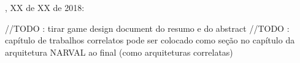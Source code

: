\documentclass[12pt, 
openright, 
oneside, 
a4paper,    
brazil]{facom-ufu-abntex2}
\begin{document}

\pagestyle{plain}



\imprimircapa

\begin{folhadeaprovacao}

  \begin{center}
    {\ABNTEXchapterfont\large\imprimirautor}

    \vspace*{\fill}\vspace*{\fill}
    {\ABNTEXchapterfont\bfseries\Large\imprimirtitulo}
    \vspace*{\fill}
    
    \hspace{.45\textwidth}
    \begin{minipage}{.5\textwidth}
    \imprimirpreambulo
    \end{minipage}%
    \vspace*{\fill}
   \end{center}
    
   \imprimirlocal, XX de XX de 2018: %

      
   \begin{center}
    \vspace*{0.5cm}
    {\large\imprimirlocal}
    \par
    {\large\imprimirdata}
    \vspace*{1cm}
  \end{center}
  
\end{folhadeaprovacao}

//TODO : tirar game design document do resumo e do 
abstract
//TODO : capítulo de trabalhos correlatos pode ser colocado como seção no capítulo da arquitetura NARVAL ao final (como arquiteturas correlatas)
\end{document}
